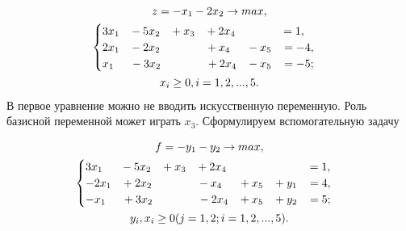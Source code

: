 \begin{gather*}
z=-x_{1}-2x_{2}\rightarrow max,\\
\begin{cases}
 3x_{1} \hspace{3mm} -5x_{2} \hspace{3mm}+x_3 \hspace{3mm}+2x_{4} \hspace{14mm}  =1,\\
 2x_{1}\hspace{3mm} -2x_{2}\hspace{14mm} +x_{4}\hspace{5mm} -x_{5}\hspace{3mm}  =-4,\\
 x_{1}\hspace{5mm}  -3x_{2}\hspace{14mm} +2x_{4}\hspace{3mm} -x_{5}\hspace{3mm}  =-5;
\end{cases}\\
x_{i}\geq0, i=1,2,...,5.
\end{gather*}
В первое уравнение можно не вводить искусственную переменную. Роль базисной переменной может играть $x_{3}$. Сформулируем вспомогательную задачу

\begin{gather*}
f=-y_{1}-y_{2}\rightarrow max,\\
\begin{cases}
3x_{1}\hspace{5,5mm} -5x_{2}\hspace{3mm} +x_3\hspace{3mm} +2x_{4}\hspace{25mm}    =1,\\
-2x_{1}\hspace{3mm} +2x_{2}\hspace{14mm}   -x_{4}\hspace{5mm} +x_{5}\hspace{3mm} +y_{1}\hspace{3mm} =4,\\
-x_{1}\hspace{5mm}  +3x_{2}\hspace{14mm} -2x_{4}\hspace{3mm} +x_{5}\hspace{3mm} +y_{2}\hspace{3mm} =5;
\end{cases}\\
y_{i}, x_{i}\geq0 (j=1,2; i=1,2,...,5).
\end{gather*}

